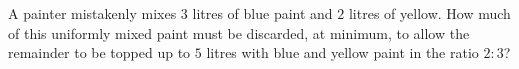 A painter mistakenly mixes $3$ litres of blue paint and $2$ litres of yellow. How much of this uniformly mixed paint must be discarded, at minimum, to allow the remainder to be topped up to $5$ litres with blue and yellow paint in the ratio $2:3$?
